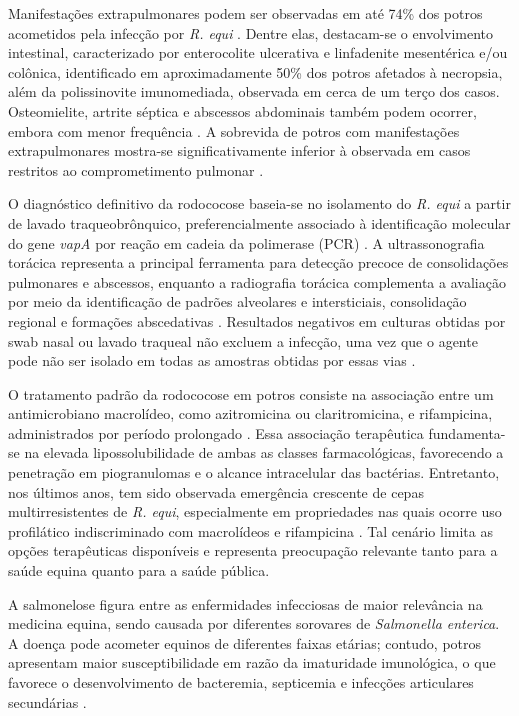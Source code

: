 Manifestações extrapulmonares podem ser observadas em até 74\% dos
potros acometidos pela infecção por \textit{R. equi} \cite{Giguere2011}.
Dentre elas, destacam-se o envolvimento intestinal, caracterizado por
enterocolite ulcerativa e linfadenite mesentérica e/ou colônica,
identificado em aproximadamente 50\% dos potros afetados à necropsia,
além da polissinovite imunomediada, observada em cerca de um terço dos
casos. Osteomielite, artrite séptica e abscessos abdominais também podem
ocorrer, embora com menor frequência \cite{Lascola2024}. A sobrevida de
potros com manifestações extrapulmonares mostra-se significativamente
inferior à observada em casos restritos ao comprometimento pulmonar
\cite{Giguere2011}.

O diagnóstico definitivo da rodococose baseia-se no isolamento do
\textit{R. equi} a partir de lavado traqueobrônquico, preferencialmente
associado à identificação molecular do gene \textit{vapA} por reação em
cadeia da polimerase (PCR) \cite{Cohen2014, Muscatello2012}. A
ultrassonografia torácica representa a principal ferramenta para
detecção precoce de consolidações pulmonares e abscessos, enquanto a
radiografia torácica complementa a avaliação por meio da identificação
de padrões alveolares e intersticiais, consolidação regional e formações
abscedativas \cite{Cohen2014, Muscatello2012}. Resultados negativos em
culturas obtidas por swab nasal ou lavado traqueal não excluem a
infecção, uma vez que o agente pode não ser isolado em todas as amostras
obtidas por essas vias \cite{Sanz2023}.

O tratamento padrão da rodococose em potros consiste na associação entre
um antimicrobiano macrolídeo, como azitromicina ou claritromicina, e
rifampicina, administrados por período prolongado \cite{Bordin2022, Cohen2014}.
Essa associação terapêutica fundamenta-se na elevada
lipossolubilidade de ambas as classes farmacológicas, favorecendo a
penetração em piogranulomas e o alcance intracelular das bactérias.
Entretanto, nos últimos anos, tem sido observada emergência crescente de
cepas multirresistentes de \textit{R. equi}, especialmente em propriedades
nas quais ocorre uso profilático indiscriminado com macrolídeos e
rifampicina \cite{Bordin2022, Giguere2017}. Tal cenário limita as
opções terapêuticas disponíveis e representa preocupação relevante tanto
para a saúde equina quanto para a saúde pública.

A salmonelose figura entre as enfermidades infecciosas de maior
relevância na medicina equina, sendo causada por diferentes sorovares de
\textit{Salmonella enterica}. A doença pode acometer equinos de diferentes
faixas etárias; contudo, potros apresentam maior susceptibilidade em
razão da imaturidade imunológica, o que favorece o desenvolvimento de
bacteremia, septicemia e infecções articulares secundárias
\cite{TraubDargatz2016}.

